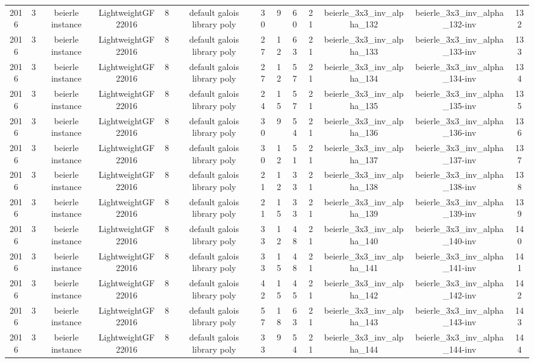 \begin{tabular}{c c c c c c c c c c c c c}
2016 & 3 & beierle instance & LightweightGF22016 & 8 & default galois library poly & 30 & 9 & 60 & 21 & beierle_3x3_inv_alpha_132 & beierle_3x3_inv_alpha_132-inv & 132 \\
2016 & 3 & beierle instance & LightweightGF22016 & 8 & default galois library poly & 27 & 12 & 63 & 21 & beierle_3x3_inv_alpha_133 & beierle_3x3_inv_alpha_133-inv & 133 \\
2016 & 3 & beierle instance & LightweightGF22016 & 8 & default galois library poly & 27 & 12 & 57 & 21 & beierle_3x3_inv_alpha_134 & beierle_3x3_inv_alpha_134-inv & 134 \\
2016 & 3 & beierle instance & LightweightGF22016 & 8 & default galois library poly & 24 & 15 & 57 & 21 & beierle_3x3_inv_alpha_135 & beierle_3x3_inv_alpha_135-inv & 135 \\
2016 & 3 & beierle instance & LightweightGF22016 & 8 & default galois library poly & 30 & 9 & 54 & 21 & beierle_3x3_inv_alpha_136 & beierle_3x3_inv_alpha_136-inv & 136 \\
2016 & 3 & beierle instance & LightweightGF22016 & 8 & default galois library poly & 30 & 12 & 51 & 21 & beierle_3x3_inv_alpha_137 & beierle_3x3_inv_alpha_137-inv & 137 \\
2016 & 3 & beierle instance & LightweightGF22016 & 8 & default galois library poly & 21 & 12 & 33 & 21 & beierle_3x3_inv_alpha_138 & beierle_3x3_inv_alpha_138-inv & 138 \\
2016 & 3 & beierle instance & LightweightGF22016 & 8 & default galois library poly & 21 & 15 & 33 & 21 & beierle_3x3_inv_alpha_139 & beierle_3x3_inv_alpha_139-inv & 139 \\
2016 & 3 & beierle instance & LightweightGF22016 & 8 & default galois library poly & 33 & 12 & 48 & 21 & beierle_3x3_inv_alpha_140 & beierle_3x3_inv_alpha_140-inv & 140 \\
2016 & 3 & beierle instance & LightweightGF22016 & 8 & default galois library poly & 33 & 15 & 48 & 21 & beierle_3x3_inv_alpha_141 & beierle_3x3_inv_alpha_141-inv & 141 \\
2016 & 3 & beierle instance & LightweightGF22016 & 8 & default galois library poly & 42 & 15 & 45 & 21 & beierle_3x3_inv_alpha_142 & beierle_3x3_inv_alpha_142-inv & 142 \\
2016 & 3 & beierle instance & LightweightGF22016 & 8 & default galois library poly & 57 & 18 & 63 & 21 & beierle_3x3_inv_alpha_143 & beierle_3x3_inv_alpha_143-inv & 143 \\
2016 & 3 & beierle instance & LightweightGF22016 & 8 & default galois library poly & 33 & 9 & 54 & 21 & beierle_3x3_inv_alpha_144 & beierle_3x3_inv_alpha_144-inv & 144 \\

\end{tabular}
